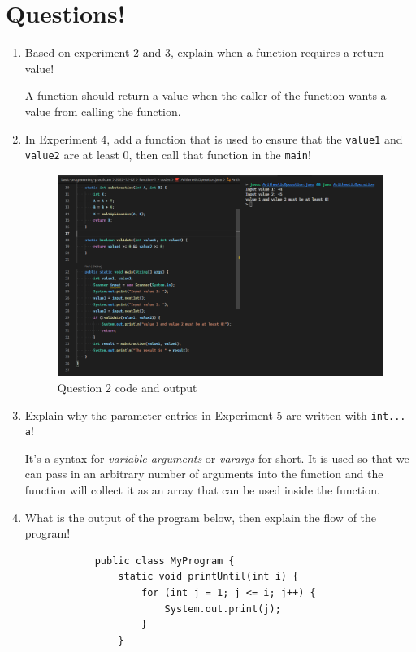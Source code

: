 \documentclass[12pt,titlepage]{article}
\begin{document}
\section{Questions!}
\begin{enumerate}
    \item {
        Based on experiment 2 and 3, explain when a function requires a return value!

        A function should return a value when the caller of the function wants a value
        from calling the function.
    }
    \item {
        In Experiment 4, add a function that is used to ensure that the \texttt{value1} and \texttt{value2}
        are at least 0, then call that function in the \texttt{main}!

        \begin{figure}[h]
            \centering
            \includegraphics[width=.8\textwidth]{./images/arithmetic-operation-validation.png}
            \caption{Question 2 code and output}
        \end{figure}
    }
    \pagebreak
    \item {
        Explain why the parameter entries in Experiment 5 are written with \texttt{int... a}!

        It's a syntax for \textit{variable arguments} or \textit{varargs} for short. It is used
        so that we can pass in an arbitrary number of arguments into the function and
        the function will collect it as an array that can be used inside the function.
    }
    \item {
        What is the output of the program below, then explain the flow of the program!

        \begin{verbatim}
            public class MyProgram {
                static void printUntil(int i) {
                    for (int j = 1; j <= i; j++) {
                        System.out.print(j);
                    }
                }


\end{verbatim}}
\end{enumerate}
\end{document}

